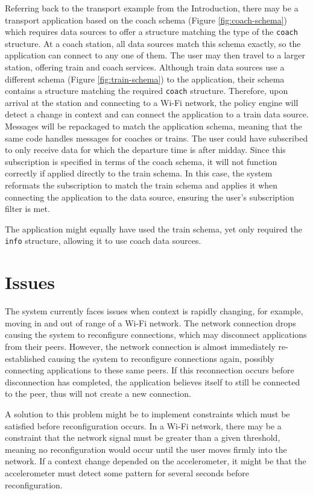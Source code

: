 \documentclass[12pt,twoside,notitlepage]{report}
\begin{document}
Referring back to the transport example from the Introduction, there may be a transport application based on the coach schema (Figure \ref{fig:coach-schema}) which requires data sources to offer a structure matching the type of the {\tt coach} structure. 
At a coach station, all data sources match this schema exactly, so the application can connect to any one of them. 
The user may then travel to a larger station, offering train and coach services. 
Although train data sources use a different schema (Figure \ref{fig:train-schema}) to the application, their schema contains a structure matching the required {\tt coach} structure.
Therefore, upon arrival at the station and connecting to a Wi-Fi network, the policy engine will detect a change in context and can connect the application to a train data source. 
Messages will be repackaged to match the application schema, meaning that the same code handles messages for coaches or trains.
The user could have subscribed to only receive data for which the departure time is after midday. 
Since this subscription is specified in terms of the coach schema, it will not function correctly if applied directly to the train schema. 
In this case, the system reformats the subscription to match the train schema and applies it when connecting the application to the data source, ensuring the user's subscription filter is met.

The application might equally have used the train schema, yet only required the {\tt info} structure, allowing it to use coach data sources.

\section{Issues}
The system currently faces issues when context is rapidly changing, for example, moving in and out of range of a Wi-Fi network. 
The network connection drops causing the system to reconfigure connections, which may disconnect applications from their peers.
However, the network connection is almost immediately re-established causing the system to reconfigure connections again, possibly connecting applications to these same peers. 
If this reconnection occurs before disconnection has completed, the application believes itself to still be connected to the peer, thus will not create a new connection.

A solution to this problem might be to implement constraints which must be satisfied before reconfiguration occurs. 
In a Wi-Fi network, there may be a constraint that the network signal must be greater than a given threshold, meaning no reconfiguration would occur until the user moves firmly into the network. 
If a context change depended on the accelerometer, it might be that the accelerometer must detect some pattern for several seconds before reconfiguration.
\end{document}
